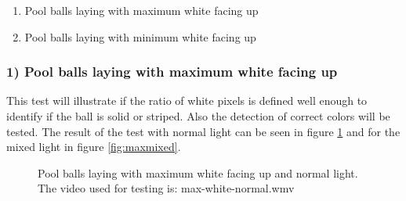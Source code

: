 \begin{enumerate}
\setlength{\itemsep}{0mm}
	\item Pool balls laying with maximum white facing up\\
	\item Pool balls laying with minimum white facing up\\
\end{enumerate}

\subsubsection{1) Pool balls laying with maximum white facing up}
This test will illustrate if the ratio of white pixels is defined well enough to identify if the ball is solid or striped. Also the detection of correct colors will be tested. The result of the test with normal light can be seen in figure \ref{fig:maxnormal} and for the mixed light in figure \ref{fig:maxmixed}.

\begin{figure}[H]
  \centering
  \quad
	\quad
   \caption{Pool balls laying with maximum white facing up and normal light. The video used for testing is: max-white-normal.wmv}
  \label{fig:maxnormal}
\end{figure}


